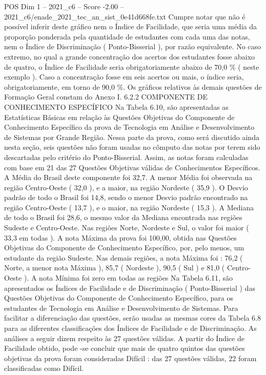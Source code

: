 \begin{textsample}{POS Dim 1 – 2021\_c6 – Score -2.00 – 2021\_c6/enade\_2021\_tec\_an\_sist\_0e41d668fe.txt}
Cumpre notar que não é possível inferir deste gráfico nem o Índice de Facilidade, que seria uma média da proporção ponderada pela quantidade de estudantes com cada uma das notas, nem o Índice de Discriminação ( Ponto-Bisserial ), por razão equivalente.
No caso extremo, no qual a grande concentração dos acertos dos estudantes fosse abaixo de quatro, o Índice de Facilidade seria obrigatoriamente abaixo de 70,0 \% ( neste exemplo ).
Caso a concentração fosse em seis acertos ou mais, o índice seria, obrigatoriamente, em torno de 90,0 \%.
Os gráficos relativos às demais questões de Formação Geral constam do Anexo I. 6.2.2 COMPONENTE DE CONHECIMENTO ESPECÍFICO Na Tabela 6.10, são apresentadas as Estatísticas Básicas em relação às Questões Objetivas do Componente de Conhecimento Específico da prova de Tecnologia em Análise e Desenvolvimento de Sistemas por Grande Região.
Nessa parte da prova, como será discutido ainda nesta seção, seis questões não foram usadas no cômputo das notas por terem sido descartadas pelo critério do Ponto-Bisserial.
Assim, as notas foram calculadas com base em 21 das 27 Questões Objetivas válidas de Conhecimentos Específicos.
A Média do Brasil deste componente foi 32,7.
A menor Média foi observada na região Centro-Oeste ( 32,0 ), e a maior, na região Nordeste ( 35,9 ).
O Desvio padrão de todo o Brasil foi 14,8, sendo o menor Desvio padrão encontrado na região Centro-Oeste ( 13,7 ), e o maior, na região Nordeste ( 15,3 ).
A Mediana de todo o Brasil foi 28,6, o mesmo valor da Mediana encontrada nas regiões Sudeste e Centro-Oeste.
Nas regiões Norte, Nordeste e Sul, o valor foi maior ( 33,3 em todas ).
A nota Máxima da prova foi 100,00, obtida nas Questões Objetivas do Componente de Conhecimento Específico, por, pelo menos, um estudante da região Sudeste.
Nas demais regiões, a nota Máxima foi : 76,2 ( Norte, a menor nota Máxima ), 85,7 ( Nordeste ), 90,5 ( Sul ) e 81,0 ( Centro-Oeste ).
A nota Mínima foi zero em todas as regiões Na Tabela 6.11, são apresentados os Índices de Facilidade e de Discriminação ( Ponto-Bisserial ) das Questões Objetivas do Componente de Conhecimento Específico, para os estudantes de Tecnologia em Análise e Desenvolvimento de Sistemas.
Para facilitar a diferenciação das questões, serão usadas as mesmas cores da Tabela 6.8 para as diferentes classificações dos Índices de Facilidade e de Discriminação.
As análises a seguir dizem respeito às 27 questões válidas.
A partir do Índice de Facilidade obtido, pode -se concluir que mais de quatro quintos das questões objetivas da prova foram consideradas Difícil : das 27 questões válidas, 22 foram classificadas como Difícil.

\end{textsample}

